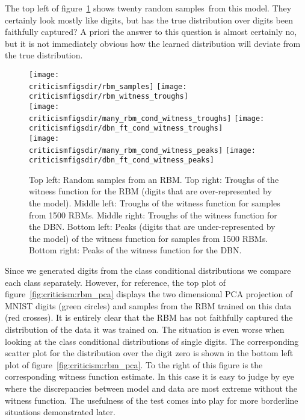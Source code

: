 The top left of figure~\ref{fig:digits} shows twenty random samples\footnotemark~from this model.
They certainly look mostly like digits, but has the true distribution over digits been faithfully captured?
A priori the answer to this question is almost certainly no, but it is not immediately obvious how the learned distribution will deviate from the true distribution.

\begin{figure}[ht]
\centering
\texttt{[image: \\criticismfigsdir/rbm\_samples]}
\texttt{[image: \\criticismfigsdir/rbm\_witness\_troughs]}
\\
\texttt{[image: \\criticismfigsdir/many\_rbm\_cond\_witness\_troughs]}
\texttt{[image: \\criticismfigsdir/dbn\_ft\_cond\_witness\_troughs]}
\\
\texttt{[image: \\criticismfigsdir/many\_rbm\_cond\_witness\_peaks]}
\texttt{[image: \\criticismfigsdir/dbn\_ft\_cond\_witness\_peaks]}
\caption{
Top left: Random samples from an RBM.
Top right: Troughs of the witness function for the RBM (digits that are over-represented by the model).
Middle left: Troughs of the witness function for samples from 1500 RBMs.
Middle right: Troughs of the witness function for the DBN.
Bottom left: Peaks (digits that are under-represented by the model) of the witness function for samples from 1500 RBMs.
Bottom right: Peaks of the witness function for the DBN.
}
\label{fig:digits}
\end{figure}

Since we generated digits from the class conditional distributions we compare each class separately.
However, for reference, the top plot of figure~\ref{fig:criticism:rbm_pca} displays the two dimensional PCA projection of MNIST digits (green circles) and samples from the RBM trained on this data (red crosses).
It is entirely clear that the RBM has not faithfully captured the distribution of the data it was trained on.
The situation is even worse when looking at the class conditional distributions of single digits.
The corresponding scatter plot for the distribution over the digit zero is shown in the bottom left plot of figure~\ref{fig:criticism:rbm_pca}.
To the right of this figure is the corresponding witness function estimate.
In this case it is easy to judge by eye where the discrepancies between model and data are most extreme without the witness function.
The usefulness of the test comes into play for more borderline situations demonstrated later.

